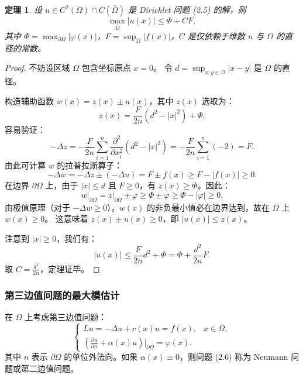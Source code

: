 \documentclass[12pt,a4paper]{ctexart}
\newtheorem{theorem}{定理}[section]
\begin{document}
	\begin{theorem}
		设 $u \in C^2(\Omega) \cap C(\bar{\Omega})$ 是 Dirichlet 问题 (2.5) 的解，则
		\begin{equation}
			\max_{\bar{\Omega}} |u(x)| \le \Phi + C F,
		\end{equation}
		其中 $\Phi = \max_{\partial \Omega} |\varphi(x)|$，$F = \sup_{\Omega} |f(x)|$，$C$ 是仅依赖于维数 $n$ 与 $\Omega$ 的直径的常数。
	\end{theorem}
	
	\begin{proof}
		不妨设区域 $\Omega$ 包含坐标原点 $x=0$。
		令 $d = \sup_{x,y \in \Omega} |x-y|$ 是 $\Omega$ 的直径。
		
		构造辅助函数 $w(x) = z(x) \pm u(x)$，其中 $z(x)$ 选取为：
		\[
		z(x) = \frac{F}{2n}(d^2 - |x|^2) + \Phi.
		\]
		容易验证：
		\[
		-\Delta z = -\frac{F}{2n} \sum_{i=1}^n \frac{\partial^2}{\partial x_i^2}(d^2 - |x|^2) = -\frac{F}{2n} \sum_{i=1}^n (-2) = F.
		\]
		由此可计算 $w$ 的拉普拉斯算子：
		\[
		-\Delta w = -\Delta z \pm (-\Delta u) = F \pm f(x) \ge F - |f(x)| \ge 0.
		\]
		在边界 $\partial \Omega$ 上，由于 $|x| \le d$ 且 $F \ge 0$，有 $z(x) \ge \Phi$。因此：
		\[
		w \big|_{\partial \Omega} = z \big|_{\partial \Omega} \pm \varphi \ge \Phi \pm \varphi \ge \Phi - |\varphi| \ge 0.
		\]
		由极值原理（对于 $-\Delta w \ge 0$），$w(x)$ 的非负最小值必在边界达到，故在 $\Omega$ 上 $w(x) \ge 0$。
		这意味着 $z(x) \pm u(x) \ge 0$，即 $|u(x)| \le z(x)$。
		
		注意到 $|x| \ge 0$，我们有：
		\[
		|u(x)| \le \frac{F}{2n} d^2 + \Phi = \Phi + \frac{d^2}{2n} F.
		\]
		取 $C = \frac{d^2}{2n}$，定理证毕。
	\end{proof}
	
	\subsubsection{第三边值问题的最大模估计}
	
	在 $\Omega$ 上考虑第三边值问题：
	\begin{equation}
		\begin{cases}
			Lu = -\Delta u + c(x)u = f(x), & x \in \Omega, \\
			\left( \frac{\partial u}{\partial n} + \alpha(x)u \right) \bigg|_{\partial \Omega} = \varphi(x).
		\end{cases} \tag{2.6}
	\end{equation}
	其中 $n$ 表示 $\partial \Omega$ 的单位外法向。如果 $\alpha(x) \equiv 0$，则问题 (2.6) 称为 Neumann 问题或第二边值问题。
	
\end{document}
